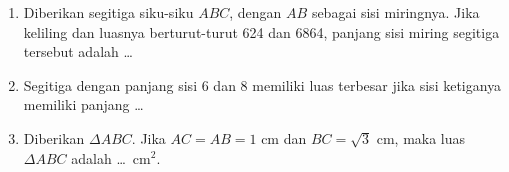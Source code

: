 \documentclass[12pt]{scrartcl}
\begin{document}
\begin{enumerate}
	\item
	Diberikan segitiga siku-siku $ABC$, dengan $AB$ sebagai sisi miringnya. Jika keliling dan luasnya berturut-turut 624 dan 6864, panjang sisi miring segitiga tersebut adalah \dots

	\item
	Segitiga dengan panjang sisi 6 dan 8 memiliki luas terbesar jika sisi ketiganya memiliki panjang \dots

	\item
	Diberikan $\Delta ABC$. Jika $AC = AB = 1\text{ cm}$ dan $BC = \sqrt{3}\text{ cm}$, maka luas $\Delta ABC$ adalah \dots\ $\text{cm}^2$.
\end{enumerate}
\end{document}
